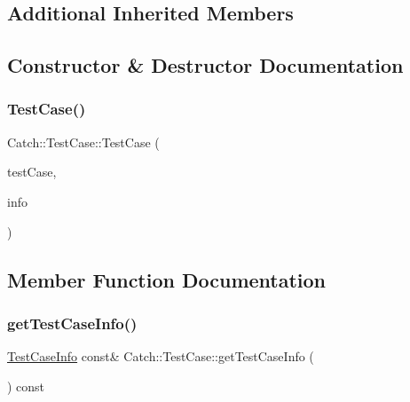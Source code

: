 \subsection*{Additional Inherited Members}


\subsection{Constructor \& Destructor Documentation}
\mbox{\label{class_catch_1_1_test_case_aae5709fc1cb68e19ab0ac27e1ffd6a76}} 
\subsubsection{\texorpdfstring{Test\+Case()}{TestCase()}}
{\footnotesize\ttfamily Catch\+::\+Test\+Case\+::\+Test\+Case (\begin{DoxyParamCaption}\item[{\mbox{\hyperlink{struct_catch_1_1_i_test_invoker}{I\+Test\+Invoker}} $\ast$}]{test\+Case,  }\item[{\mbox{\hyperlink{struct_catch_1_1_test_case_info}{Test\+Case\+Info}} \&\&}]{info }\end{DoxyParamCaption})}



\subsection{Member Function Documentation}
\mbox{\label{class_catch_1_1_test_case_a1ea0d79f49156cebea076fe1ba50d2b6}} 
\subsubsection{\texorpdfstring{get\+Test\+Case\+Info()}{getTestCaseInfo()}}
{\footnotesize\ttfamily \mbox{\hyperlink{struct_catch_1_1_test_case_info}{Test\+Case\+Info}} const\& Catch\+::\+Test\+Case\+::get\+Test\+Case\+Info (\begin{DoxyParamCaption}{ }\end{DoxyParamCaption}) const}


